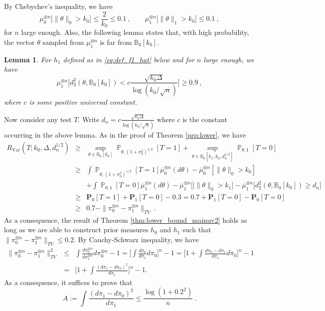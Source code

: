 \documentclass[twoside,11pt]{article}
\newtheorem{lem}{Lemma}
\def\beq{\begin{equation}}
\def\eeq{\end{equation}}
\def\beqn{\begin{eqnarray*}}
\def\eeqn{\end{eqnarray*}}
\def\bbB{\mathbb{B}}
\renewcommand{\P}{\operatorname{\mathbb{P}}}
\newcommand{\<}{\langle}
\renewcommand{\>}{\rangle}
\begin{document}
\medskip 

By Chebychev's inequality, we have 
\beq\label{eq:el1}
\mu_0^{\otimes n}\big[\|\theta\|_0 > k_0\big]\leq \frac{2}{k_0} \leq 0.1 \ , \quad\quad  \mu_1^{\otimes n}\big[\|\theta\|_1 > k_0\big] \leq 0.1\ ,
\eeq
for $n$ large enough. Also, the following lemma states that, with high probability, the vector $\theta$ sampled from $\mu_1^{\otimes n}$ is far from $\bbB_0[k_0]$. 

\begin{lem}\label{lem:distance_H0_UV}
For $h_1$ defined as in \eqref{eq:def_f1_hat} below and for $n$ large enough, we have 
 \[
  \mu_1^{\otimes n}\Big[d^2_2(\theta,\bbB_0[k_0]) < c \frac{\sqrt{k_0\Delta}}{\log(k_0/\sqrt{n})}\Big] \geq 0.9\ , 
 \]
 where $c$ is some positive universal constant. 
\end{lem}
Now consider any test $T$. Write $d_n=  c \frac{\sqrt{k_0\Delta}}{\log(k_0/\sqrt{n})}$ where $c$ is the constant occurring in the above lemma. As in the proof of Theorem \ref{prp:lower}, we have 
\beqn 
R_{\mathrm{Var}}(T;k_0,\Delta,d^{1/2}_n)&\geq& \sup_{\theta \in \bbB_0[k_0]}\P_{\theta,(1+\sigma_0^2)^{1/2}}[T=1] +  \sup_{\theta \in \bbB_0[k_1,k_0,d^{1/2}_n]}\P_{\theta,1}[T=0] \\
 &\geq& \int \P_{\theta,(1+\sigma_0^2)^{1/2}}[T=1]\overline{\mu}_0^{\otimes n}(d\theta) - \overline{\mu}_0^{\otimes n}[\|\theta\|_{0}> k_0] \\ &&  + \int \P_{\theta,1}[T=0]\overline{\mu}_1^{\otimes n}(d\theta)- \overline{\mu}_1^{\otimes n}\big[|\|\theta\|_{0}>k_1\big]- \overline{\mu}_1^{\otimes n}\big[d^2_2(\theta,\bbB_0[k_0]) \geq d_n\big]\\
 &\geq & \mathbf{P}_0[T=1] + \mathbf{P}_{1}[T=0] - 0.3 = 0.7  + \mathbf{P}_{1}[T=0]- \mathbf{P}_0[T=0]\\
 &\geq & 0.7 - \|\pi_0^{\otimes n} - \pi_1^{\otimes n}\|_{TV}\ . 
 \eeqn 
As a consequence, the result of Theorem \ref{thm:lower_bound_mainuv2} holds as long as we are able to construct prior measures $h_0$ and $h_1$ such that $\|\pi_0^{\otimes n} - \pi_1^{\otimes n}\|_{TV}\leq 0.2$. By Cauchy-Schwarz inequality, we have
\beqn
\|\pi_0^{\otimes n} - \pi_1^{\otimes n} \|_{TV}^2 &\leq& \int \frac{d\pi_0^{\otimes n}}{d\pi_1^{\otimes n}}d\pi_0^{\otimes n} - 1 = \Big[\int \frac{d\pi_0}{d\pi_1}d\pi_0\Big]^n - 1 = \Big[1+ \int \frac{d\pi_0 - d\pi_1}{d\pi_1}d\pi_0\Big]^n - 1 \nonumber\\
&= &\Big[1 + \int \frac{(d\pi_1 - d\pi_0)^2}{d\pi_1}\Big]^n - 1 . 
\eeqn 
As a consequence, it suffices to prove that 
\beq  \label{eq:objective_A}
A:= \int \frac{(d\pi_1 - d\pi_0)^2}{d\pi_1}\leq \frac{\log(1+0.2^2)}{n}\ . 
\eeq
\end{document}
